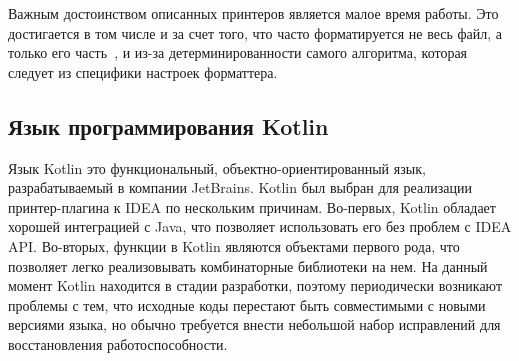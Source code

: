 Важным достоинством описанных принтеров является малое время работы.
Это достигается в том числе и за счет того, что часто форматируется не весь
файл, а только его часть~\cite{eclipse},
и из-за детерминированности самого алгоритма, которая следует из специфики
настроек форматтера.

\newpage


\newpage
\subsection{Язык программирования Kotlin}

Язык Kotlin это функциональный, объектно-ориентированный язык,
разрабатываемый в компании JetBrains.
Kotlin был выбран для реализации принтер-плагина к IDEA по нескольким причинам. 
Во-первых, Kotlin обладает хорошей интеграцией с Java, что позволяет
использовать его без проблем с IDEA API. 
Во-вторых, функции в Kotlin являются объектами первого рода, что позволяет
легко реализовывать комбинаторные библиотеки на нем.
На данный момент Kotlin находится в стадии разработки, поэтому
периодически возникают
проблемы с тем, что исходные коды перестают быть совместимыми с новыми
версиями языка,
но обычно требуется внести небольшой набор исправлений для
восстановления работоспособности.
